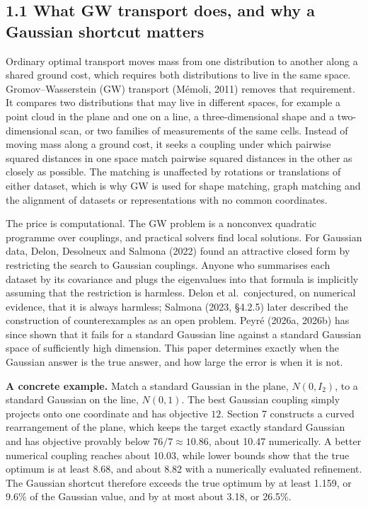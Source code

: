 \documentclass[
  british,
  11pt,
  a4paper,
]{article}
\begin{document}
\subsection{1.1 What GW transport does, and why a Gaussian shortcut
matters}\label{what-gw-transport-does-and-why-a-gaussian-shortcut-matters}

Ordinary optimal transport moves mass from one distribution to another
along a shared ground cost, which requires both distributions to live in
the same space. Gromov--Wasserstein (GW) transport (Mémoli, 2011)
removes that requirement. It compares two distributions that may live in
different spaces, for example a point cloud in the plane and one on a
line, a three-dimensional shape and a two-dimensional scan, or two
families of measurements of the same cells. Instead of moving mass along
a ground cost, it seeks a coupling under which pairwise squared
distances in one space match pairwise squared distances in the other as
closely as possible. The matching is unaffected by rotations or
translations of either dataset, which is why GW is used for shape
matching, graph matching and the alignment of datasets or
representations with no common coordinates.

The price is computational. The GW problem is a nonconvex quadratic
programme over couplings, and practical solvers find local solutions.
For Gaussian data, Delon, Desolneux and Salmona (2022) found an
attractive closed form by restricting the search to Gaussian couplings.
Anyone who summarises each dataset by its covariance and plugs the
eigenvalues into that formula is implicitly assuming that the
restriction is harmless. Delon et al.~conjectured, on numerical
evidence, that it is always harmless; Salmona (2023, §4.2.5) later
described the construction of counterexamples as an open problem. Peyré
(2026a, 2026b) has since shown that it fails for a standard Gaussian
line against a standard Gaussian space of sufficiently high dimension.
This paper determines exactly when the Gaussian answer is the true
answer, and how large the error is when it is not.

\textbf{A concrete example.} Match a standard Gaussian in the plane,
\(N(0,I_2)\), to a standard Gaussian on the line, \(N(0,1)\). The best
Gaussian coupling simply projects onto one coordinate and has objective
\(12\). Section 7 constructs a curved rearrangement of the plane, which
keeps the target exactly standard Gaussian and has objective provably
below \(76/7\approx10.86\), about 10.47 numerically. A better numerical
coupling reaches about 10.03, while lower bounds show that the true
optimum is at least 8.68, and about 8.82 with a numerically evaluated
refinement. The Gaussian shortcut therefore exceeds the true optimum by
at least 1.159, or 9.6\% of the Gaussian value, and by at most about
3.18, or 26.5\%.
\end{document}
